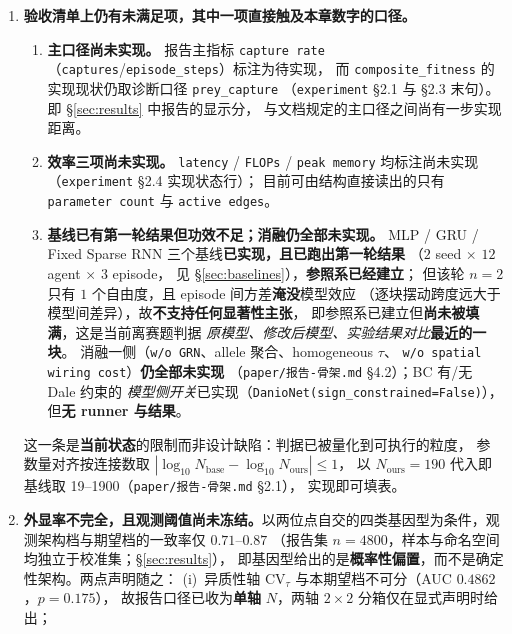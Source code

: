 \begin{enumerate}
  \item \textbf{验收清单上仍有未满足项，其中一项直接触及本章数字的口径。}
  \begin{enumerate}
    \item \textbf{主口径尚未实现。} 报告主指标 \texttt{capture rate}
          （\texttt{captures}/\texttt{episode\_steps}）标注为待实现，
          而 \texttt{composite\_fitness} 的实现现状仍取诊断口径 \texttt{prey\_capture}
          （\texttt{experiment} \S2.1 与 \S2.3 末句）。即 \S\ref{sec:results} 中报告的显示分，
          与文档规定的主口径之间尚有一步实现距离。
    \item \textbf{效率三项尚未实现。} \texttt{latency} / \texttt{FLOPs} / \texttt{peak memory}
          均标注尚未实现（\texttt{experiment} \S2.4 实现状态行）；
          目前可由结构直接读出的只有 \texttt{parameter count} 与 \texttt{active edges}。
    \item \textbf{基线已有第一轮结果但功效不足；消融仍全部未实现。}
          MLP / GRU / Fixed Sparse RNN 三个基线\textbf{已实现，且已跑出第一轮结果}
          （$2$ seed $\times$ $12$ agent $\times$ $3$ episode，
          见 \S\ref{sec:baselines}），\textbf{参照系已经建立}；
          但该轮 $n=2$ 只有 $1$ 个自由度，且 episode 间方差\textbf{淹没}模型效应
          （逐块摆动跨度远大于模型间差异），故\textbf{不支持任何显著性主张}，
          即参照系已建立但\textbf{尚未被填满}，这是当前离赛题判据
          \emph{原模型、修改后模型、实验结果对比}\textbf{最近的一块}。
          消融一侧（\texttt{w/o GRN}、allele 聚合、homogeneous $\tau$、
          \texttt{w/o spatial wiring cost}）\textbf{仍全部未实现}
          （\texttt{paper/报告-骨架.md} \S4.2）；BC 有/无 Dale 约束的
          \emph{模型侧开关}已实现（\texttt{DanioNet(sign\_constrained=False)}），
          但\textbf{无 runner 与结果}。
  \end{enumerate}
  这一条是\textbf{当前状态}的限制而非设计缺陷：判据已被量化到可执行的粒度，
  参数量对齐按连接数取
  $\left|\log_{10}N_{\text{base}}-\log_{10}N_{\text{ours}}\right|\le 1$，
  以 $N_{\text{ours}}=190$ 代入即基线取 19--1900（\texttt{paper/报告-骨架.md} \S2.1），
  实现即可填表。
  \item \textbf{外显率不完全，且观测阈值尚未冻结。}以两位点自交的四类基因型为条件，观测架构档与期望档的一致率仅 $0.71$--$0.87$
  （报告集 $n=4800$，样本与命名空间均独立于校准集；\S\ref{sec:results}），
  即基因型给出的是\textbf{概率性偏置}，而不是确定性架构。两点声明随之：
  (i)~异质性轴 $\mathrm{CV}_\tau$ 与本期望档不可分（AUC $0.4862$，$p=0.175$），
  故报告口径已收为\textbf{单轴} $N$，两轴 $2\times2$ 分箱仅在显式声明时给出；

\end{enumerate}

